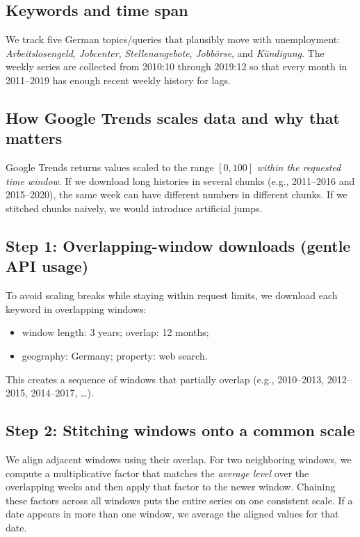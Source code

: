 \documentclass{article}
\begin{document}
\subsection{Keywords and time span}
We track five German topics/queries that plausibly move with unemployment:
\emph{Arbeitslosengeld}, \emph{Jobcenter}, \emph{Stellenangebote}, \emph{Jobbörse}, and \emph{Kündigung}.
The weekly series are collected from 2010:10 through 2019:12 so that every month in 2011–2019 has enough recent weekly history for lags.

\subsection{How Google Trends scales data and why that matters}
Google Trends returns values scaled to the range $[0,100]$ \emph{within the requested time window}. If we download long histories in several chunks (e.g., 2011–2016 and 2015–2020), the same week can have different numbers in different chunks. If we stitched chunks naively, we would introduce artificial jumps.

\subsection{Step 1: Overlapping-window downloads (gentle API usage)}
To avoid scaling breaks while staying within request limits, we download each keyword in overlapping windows:
\begin{itemize}
  \item window length: 3 years; overlap: 12 months;
  \item geography: Germany; property: web search.
\end{itemize}
This creates a sequence of windows that partially overlap (e.g., 2010–2013, 2012–2015, 2014–2017, \dots).

\subsection{Step 2: Stitching windows onto a common scale}
We align adjacent windows using their overlap. For two neighboring windows, we compute a multiplicative factor that matches the \emph{average level} over the overlapping weeks and then apply that factor to the newer window. Chaining these factors across all windows puts the entire series on one consistent scale. If a date appears in more than one window, we average the aligned values for that date.
\vspace{0.25em}
\end{document}
